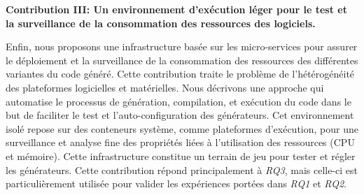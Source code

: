 \textbf{Contribution III: Un environnement d'ex\'ecution l\'eger pour le test et la surveillance de la consommation des ressources des logiciels.}

Enfin, nous proposons une infrastructure bas\'ee sur les micro-services pour assurer le d\'eploiement et la surveillance de la consommation des ressources des diff\'erentes variantes du code g\'en\'er\'e. Cette contribution traite le probl\`eme de l'h\'et\'erog\'en\'eit\'e des plateformes logicielles et mat\'erielles. Nous d\'ecrivons une approche qui automatise le processus de g\'en\'eration, compilation, et ex\'ecution du code dans le but de faciliter le test et l'auto-configuration des g\'en\'erateurs. Cet environnement isol\'e repose sur des conteneurs syst\`eme, comme plateformes d'ex\'ecution, pour une surveillance et analyse fine des propri\'et\'es li\'ees \`a l'utilisation des ressources (CPU et m\'emoire). Cette infrastructure constitue un terrain de jeu pour tester et r\'egler les g\'en\'erateurs. Cette contribution r\'epond principalement \`a \textit{RQ3}, mais celle-ci est particuli\`erement utilis\'ee pour valider les exp\'eriences port\'ees dans \textit{RQ1} et \textit{RQ2}. 

